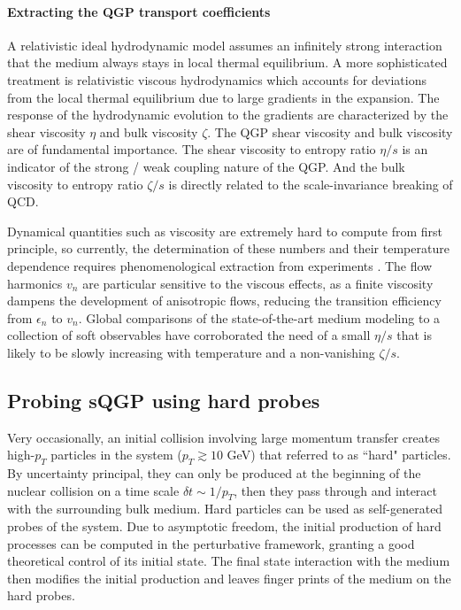 \paragraph{Extracting the QGP transport coefficients}
A relativistic ideal hydrodynamic model assumes an infinitely strong interaction that the medium always stays in local thermal equilibrium.
A more sophisticated treatment is relativistic viscous hydrodynamics which accounts for deviations from the local thermal equilibrium due to large gradients in the expansion.
The response of the hydrodynamic evolution to the gradients are characterized by the shear viscosity $\eta$ and bulk viscosity $\zeta$.
The QGP shear viscosity and bulk viscosity are of fundamental importance. 
The shear viscosity to entropy ratio $\eta/s$ is an indicator of the strong / weak coupling nature of the QGP. 
And the bulk viscosity to entropy ratio $\zeta/s$ is directly related to  the scale-invariance breaking of QCD.

Dynamical quantities such as viscosity are extremely hard to compute from first principle, so currently, the determination of these numbers and their temperature dependence requires phenomenological extraction from experiments \cite{Muronga:2004sf, Chaudhuri:2006jd, Romatschke:2007mq, Dusling:2007gi, Song:2007ux, Luzum:2008cw}.
The flow harmonics $v_n$ are particular sensitive to the viscous effects, as a finite viscosity dampens the development of anisotropic flows, reducing the transition efficiency from $\epsilon_n$ to $v_n$.
Global comparisons of the state-of-the-art medium modeling to a collection of soft observables have corroborated the need of a small $\eta/s$ that is likely to be slowly increasing with temperature and a non-vanishing $\zeta/s$.

\subsection{Probing sQGP using hard probes}
Very occasionally, an initial collision involving large momentum transfer creates high-$p_T$ particles in the system ($p_T\gtrsim 10$ GeV) that referred to as ``hard" particles.
By uncertainty principal, they can only be produced at the beginning of the nuclear collision on a time scale $\delta t \sim 1/p_T$, then they pass through and interact with the surrounding bulk medium.
Hard particles can be used as self-generated probes of the system.
Due to asymptotic freedom, the initial production of hard processes can be computed in the perturbative framework, granting a good theoretical control of its initial state.
The final state interaction with the medium then modifies the initial production and leaves finger prints of the medium on the hard probes.

